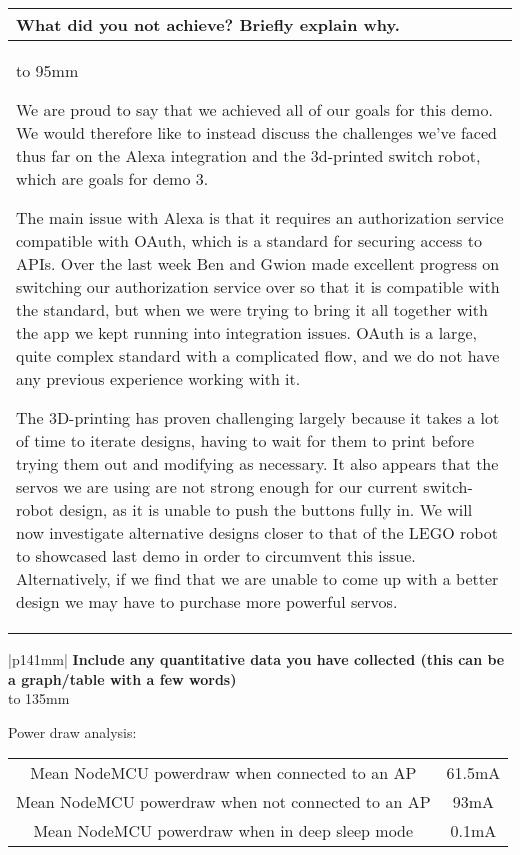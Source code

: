 \documentclass[a4paper]{article}
\newcommand{\colWidth}{141mm}
\begin{document}
\begin{center}

\begin{tabular}{|p{\colWidth}|}
	\hline
	\cellcolor{blue!25}\large
	\textbf{What did you not achieve? Briefly explain why.}
	\\ \hline
	\vtop to 95mm{
		We are proud to say that we achieved all of our goals for this demo.
		We would therefore like to instead discuss the challenges we've faced thus far on the Alexa integration and the 3d-printed switch robot, which are goals for demo 3.

		\vspace{2mm}

		The main issue with Alexa is that it requires an authorization service compatible with OAuth, which is a standard for securing access to APIs.
		Over the last week Ben and Gwion made excellent progress on switching our authorization service over so that it is compatible with the standard,
		but when we were trying to bring it all together with the app we kept running into integration issues. OAuth is a large, quite complex standard
		with a complicated flow, and we do not have any previous experience working with it.

		\vspace{2mm}

		The 3D-printing has proven challenging largely because it takes a lot of time to iterate designs, having to wait for them to print before trying them out and modifying as necessary.
		It also appears that the servos we are using are not strong enough for our current switch-robot design, as it is unable to push the buttons fully in.
		We will now investigate alternative designs closer to that of the LEGO robot to showcased last demo in order to circumvent this issue.
		Alternatively, if we find that we are unable to come up with a better design we may have to purchase more powerful servos.
  }
  \\
  \hline
\end{tabular}
\vskip 5mm


\begin{tabular}{|p{\colWidth}|}
	\hline
	\large
	\textbf{Include any quantitative data you have collected (this can be a graph/table with a few words)}
	\\ \hline
	\vtop to 135mm{
		Power draw analysis:

		\begin{tabular}{ | c | c | }
			\hline
			Mean NodeMCU powerdraw when connected to an AP & 61.5mA \\
			Mean NodeMCU powerdraw when not connected to an AP &  93mA \\
			Mean NodeMCU powerdraw when in deep sleep mode & 0.1mA \\
			\hline
		\end{tabular}

}
\end{tabular}
\end{center}
\end{document}
